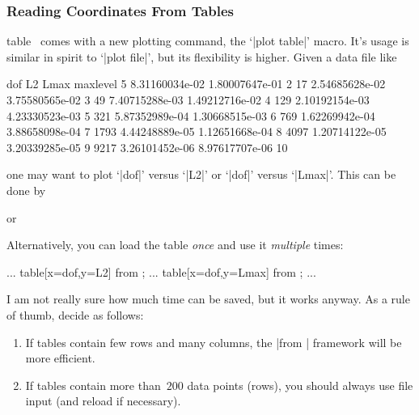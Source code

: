 \subsubsection{Reading Coordinates From Tables}

\begin{addplotoperation}[]{table}{}
\PGFPlots\ comes with a new plotting command, the `|plot table|' macro. It's usage is similar in spirit to `|plot file|', but its flexibility is higher. Given a data file like
\begin{codeexample}
dof     L2              Lmax            maxlevel
5       8.31160034e-02  1.80007647e-01  2
17      2.54685628e-02  3.75580565e-02  3
49      7.40715288e-03  1.49212716e-02  4
129     2.10192154e-03  4.23330523e-03  5
321     5.87352989e-04  1.30668515e-03  6
769     1.62269942e-04  3.88658098e-04  7
1793    4.44248889e-05  1.12651668e-04  8
4097    1.20714122e-05  3.20339285e-05  9
9217    3.26101452e-06  8.97617707e-06  10
\end{codeexample}
one may want to plot `|dof|' versus `|L2|' or `|dof|' versus `|Lmax|'. This can be done by
\begin{codeexample}
\end{codeexample}
or
\begin{codeexample}
\end{codeexample}
Alternatively, you can load the table \emph{once} and use it \emph{multiple} times:
\begin{codeexample}
\table
...
\addplot table[x=dof,y=L2] from \table;
...
\addplot table[x=dof,y=Lmax] from \table;
...
\end{codeexample}
I am not really sure how much time can be saved, but it works anyway. As a rule of thumb, decide as follows:
\begin{enumerate}
	\item If tables contain few rows and many columns, the |from | framework will be more efficient.
	\item If tables contain more than~$200$ data points (rows), you should always use file input (and reload if necessary).
\end{enumerate}


\end{addplotoperation}
